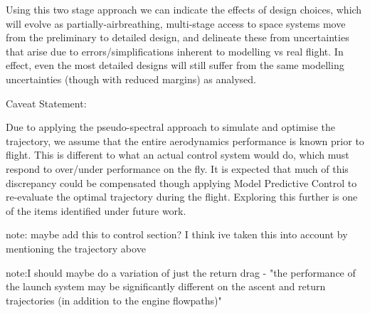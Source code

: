 Using this two stage approach we can indicate the effects of design choices, which will evolve as partially-airbreathing, multi-stage access to space systems move from the preliminary to detailed design, and delineate these from uncertainties that arise due to errors/simplifications inherent to modelling vs real flight. In effect, even the most detailed designs will still suffer from the same modelling uncertainties (though with reduced margins) as analysed. 





Caveat Statement:

Due to applying the pseudo-spectral approach to simulate and optimise the trajectory, we assume that the entire aerodynamics performance is known prior to flight. This is different to what an actual control system would do, which must respond to over/under performance on the fly. It is expected that much of this discrepancy could be compensated though applying Model Predictive Control to re-evaluate the optimal trajectory during the flight. Exploring this further is one of the items identified under future work.

note: maybe add this to control section? I think ive taken this into account by mentioning the trajectory above

note:I should maybe do a variation of just the return drag - "the performance of the launch system may be significantly different on the ascent and return trajectories (in addition to the engine flowpaths)"



